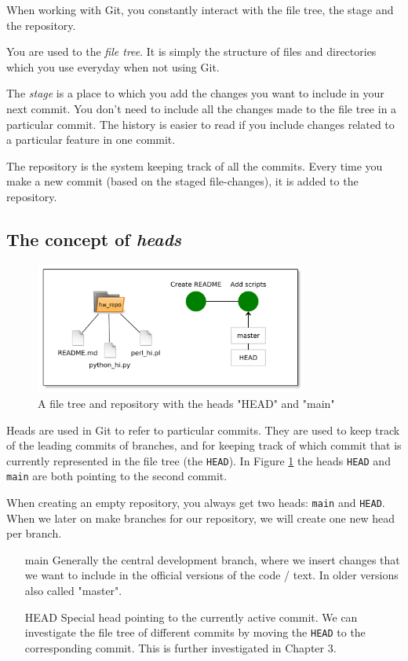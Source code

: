 \documentclass[../main/git_course_main.tex]{subfiles}
\begin{document}
	When working with Git, you constantly interact with the file tree, the stage and the repository.
	
	You are used to the \textit{file tree}. It is simply the structure of files and directories which you use everyday when not using Git.
	
	The \textit{stage} is a place to which you add the changes you want to include in your next commit. You don't need to include all the changes made to the
	file tree in a particular commit. The history is easier to read if you include changes related to a particular feature in one commit.
	
	The repository is the system keeping track of all the commits. Every time you make a new commit (based on the staged file-changes), it is added to the repository.
	
	\subsection{The concept of \textit{heads}}
	
	\begin{figure}[h!]
		\centering
		\includegraphics[width=0.8\textwidth]{../visualizations/chapter2/c25_repo_second_commit.pdf}
		\caption{A file tree and repository with the heads "HEAD" and "main"}
		\label{fig:head_illustration}
	\end{figure}
	
	Heads are used in Git to refer to particular commits. They are used to keep track of the leading commits of branches, and for keeping track of which commit that is currently represented in the file tree (the \verb$HEAD$). In Figure \ref{fig:head_illustration} the heads \verb$HEAD$ and \verb$main$ are both pointing to the second commit.
	
	When creating an empty repository, you always get two heads: \verb$main$ and \verb$HEAD$. When we later on make branches for our repository, we will create one new head per branch.
	
	\begin{enumerate}
		\item[main] Generally the central development branch, where we insert changes that we want to include in the official versions of the code / text. In older versions also called "master".
		\item[HEAD] Special head pointing to the currently active commit. We can investigate the file tree of different commits by moving the \verb$HEAD$ to the corresponding commit. This is further investigated in Chapter 3.
	\end{enumerate}
	
\end{document}
